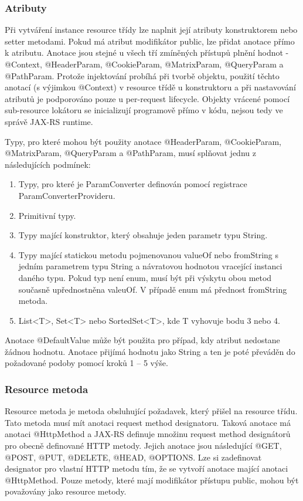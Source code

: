 \documentclass[11pt,twoside,a4paper]{book}
\begin{document}
\subsubsection{Atributy}
\label{ch:atributy}

Při vytváření instance resource třídy lze naplnit její atributy konstruktorem nebo setter
metodami. Pokud má atribut modifikátor public, lze přidat anotace přímo k atributu. Anotace
jsou stejné u všech tří zmíněných přístupů plnění hodnot - @Context, @HeaderParam,
@CookieParam, @MatrixParam, @QueryParam a @PathParam. Protože injektování probíhá
při tvorbě objektu, použití těchto anotací (s výjimkou @Context) v resource třídě u
konstruktoru a při nastavování atributů je podporováno pouze u per-request lifecycle. Objekty
vrácené pomocí sub-resource lokátoru se inicializují programově přímo v kódu, nejsou tedy
ve správě JAX-RS runtime.

Typy, pro které mohou být použity anotace @HeaderParam, @CookieParam, @MatrixParam,
@QueryParam a @PathParam, musí splňovat jednu z následujících podmínek:

\begin{enumerate}
  \item Typy, pro které je ParamConverter definován pomocí registrace
  ParamConverterProvideru.
  \item Primitivní typy.
  \item Typy mající konstruktor, který obsahuje jeden parametr typu String.
  \item Typy mající statickou metodu pojmenovanou valueOf nebo fromString s jedním
parametrem typu String a návratovou hodnotou vracející instanci daného typu. Pokud
typ není enum, musí být při výskytu obou metod současně upřednostněna valeuOf. V
případě enum má přednost fromString metoda.
  \item List<T>, Set<T> nebo SortedSet<T>, kde T vyhovuje bodu 3 nebo 4.
\end{enumerate}

Anotace @DefaultValue může být použita pro případ, kdy atribut nedostane žádnou hodnotu.
Anotace přijímá hodnotu jako String a ten je poté převáděn do požadované podoby pomocí
kroků 1 – 5 výše.

\subsubsection{Resource metoda}
\label{subsec:resource-metoda}

Resource metoda je metoda obsluhující požadavek, který přišel na resource třídu. Tato metoda
musí mít anotaci request method designatoru. Taková anotace má anotaci @HttpMethod a
JAX-RS definuje množinu request method designátorů pro obecně definované HTTP metody.
Jejich anotace jsou následující @GET, @POST, @PUT, @DELETE, @HEAD, @OPTIONS.
Lze si zadefinovat designator pro vlastní HTTP metodu tím, že se vytvoří anotace mající
anotaci @HttpMethod. Pouze metody, které mají modifikátor přístupu public, mohou být
považovány jako resource metody.
\end{document}
